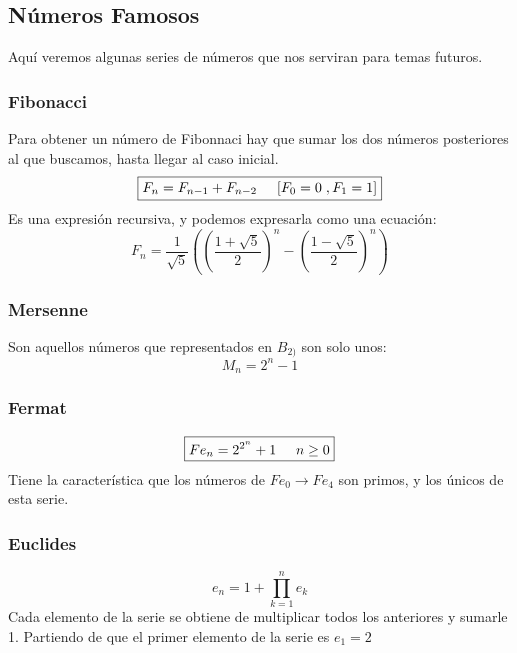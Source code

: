 \subsection{Números Famosos}
\noindent Aquí veremos algunas series de números que nos serviran para temas futuros.
\subsubsection{Fibonacci}
\noindent Para obtener un número de Fibonnaci hay que sumar los dos números posteriores al que buscamos, hasta llegar al caso inicial.
\[
        \boxed{F_n = F_{n-1} + F_{n-2} \hspace{5mm} \textnormal{[}F_0 = 0 \hspace{1mm}, F_1 = 1\textnormal{]}}
\]
\noindent Es una expresión recursiva, y podemos expresarla como una ecuación:
\[
        \boxed{F_n = \frac{1}{\sqrt{5}}\left ( \left ( \frac{1+\sqrt{5}}{2} \right )^n -\left ( \frac{1-\sqrt{5}}{2} \right )^n \right )}
\]
\subsubsection{Mersenne}
\noindent Son aquellos números que representados en \(B_{2)}\) son solo unos:
\[
        \boxed{M_n = 2^n - 1}
\]
\subsubsection{Fermat}
\[
        \boxed{Fe_n = 2^{2^n} +1 \hspace{5mm} n \geq 0}
\]
\noindent Tiene la característica que los números de \(Fe_0 \rightarrow Fe_4\) son primos, y los únicos de esta serie.
\subsubsection{Euclides}
\[
        \boxed{e_n = 1+ \prod^n_{k=1}e_k}
\]
\noindent Cada elemento de la serie se obtiene de multiplicar todos los anteriores y sumarle 1. Partiendo de que el primer elemento de la serie es \(e_1 = 2\)